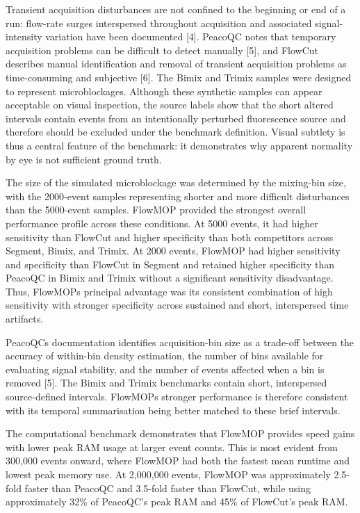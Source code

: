 \documentclass[ASNA]{latex/wiley/USG}
\begin{document}
Transient acquisition disturbances are not confined to the beginning or
end of a run: flow-rate surges interspersed throughout acquisition and
associated signal-intensity variation have been documented {[}4{]}.
PeacoQC notes that temporary acquisition problems can be difficult to
detect manually {[}5{]}, and FlowCut describes manual identification and
removal of transient acquisition problems as time-consuming and
subjective {[}6{]}. The Bimix and Trimix samples were designed to
represent microblockages. Although these synthetic samples can appear
acceptable on visual inspection, the source labels show that the short
altered intervals contain events from an intentionally perturbed
fluorescence source and therefore should be excluded under the benchmark
definition. Visual subtlety is thus a central feature of the benchmark:
it demonstrates why apparent normality by eye is not sufficient ground
truth.

The size of the simulated microblockage was determined by the mixing-bin
size, with the 2000-event samples representing shorter and more
difficult disturbances than the 5000-event samples. FlowMOP provided the
strongest overall performance profile across these conditions. At 5000
events, it had higher sensitivity than FlowCut and higher specificity
than both competitors across Segment, Bimix, and Trimix. At 2000 events,
FlowMOP had higher sensitivity and specificity than FlowCut in Segment
and retained higher specificity than PeacoQC in Bimix and Trimix without
a significant sensitivity disadvantage. Thus, FlowMOP\textquotesingle s
principal advantage was its consistent combination of high sensitivity
with stronger specificity across sustained and short, interspersed time
artifacts.

PeacoQC\textquotesingle s documentation identifies acquisition-bin size
as a trade-off between the accuracy of within-bin density estimation,
the number of bins available for evaluating signal stability, and the
number of events affected when a bin is removed {[}5{]}. The Bimix and
Trimix benchmarks contain short, interspersed source-defined intervals.
FlowMOP\textquotesingle s stronger performance is therefore consistent
with its temporal summarisation being better matched to these brief
intervals.

The computational benchmark demonstrates that FlowMOP provides speed
gains with lower peak RAM usage at larger event counts. This is most
evident from 300,000 events onward, where FlowMOP had both the fastest
mean runtime and lowest peak memory use. At 2,000,000 events, FlowMOP
was approximately 2.5-fold faster than PeacoQC and 3.5-fold faster than
FlowCut, while using approximately 32\% of PeacoQC's peak RAM and 45\%
of FlowCut's peak RAM.
\end{document}
